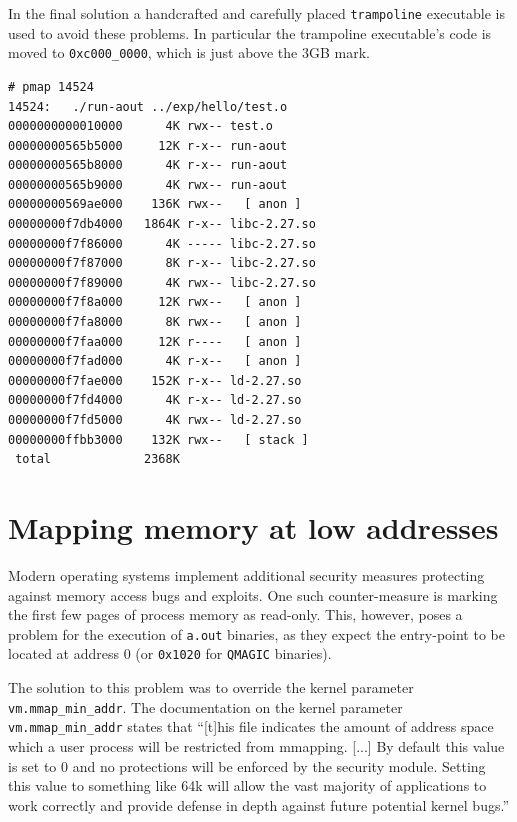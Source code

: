 \documentclass[draft,final]{vutinfth} %
\begin{document}
In the final solution a handcrafted and carefully placed \texttt{trampoline} executable is used to avoid these problems. In particular the trampoline executable's code is moved to \texttt{0xc000\_0000}, which is just above the 3GB mark.

\begin{lstlisting}[caption={Output of \texttt{pmap} showing the memory mappings of an early prototype of \texttt{run-aout}}, label={lst:pmap_run-aout1}]
# pmap 14524
14524:   ./run-aout ../exp/hello/test.o
0000000000010000      4K rwx-- test.o
00000000565b5000     12K r-x-- run-aout
00000000565b8000      4K r-x-- run-aout
00000000565b9000      4K rwx-- run-aout
00000000569ae000    136K rwx--   [ anon ]
00000000f7db4000   1864K r-x-- libc-2.27.so
00000000f7f86000      4K ----- libc-2.27.so
00000000f7f87000      8K r-x-- libc-2.27.so
00000000f7f89000      4K rwx-- libc-2.27.so
00000000f7f8a000     12K rwx--   [ anon ]
00000000f7fa8000      8K rwx--   [ anon ]
00000000f7faa000     12K r----   [ anon ]
00000000f7fad000      4K r-x--   [ anon ]
00000000f7fae000    152K r-x-- ld-2.27.so
00000000f7fd4000      4K r-x-- ld-2.27.so
00000000f7fd5000      4K rwx-- ld-2.27.so
00000000ffbb3000    132K rwx--   [ stack ]
 total             2368K
\end{lstlisting}

\section{Mapping memory at low addresses}
\label{explore_low_mmap}

Modern operating systems implement additional security measures protecting against memory access bugs and exploits. One such counter-measure is marking the first few pages of process memory as read-only. This, however, poses a problem for the execution of \texttt{a.out} binaries, as they expect the entry-point to be located at address 0 (or \texttt{0x1020} for \texttt{QMAGIC} binaries).

The solution to this problem was to override the kernel parameter \texttt{vm.mmap\_min\_addr}. The documentation on the kernel parameter \texttt{vm.mmap\_min\_addr}\cite{KernelParam1} states that ``[t]his file indicates the amount of address space which a user process will be restricted from mmapping. [...] By default this value is set to 0 and no protections will be enforced by the security module. Setting this value to something like 64k will allow the vast majority of applications to work correctly and provide defense in depth against future potential kernel bugs.''
\end{document}
